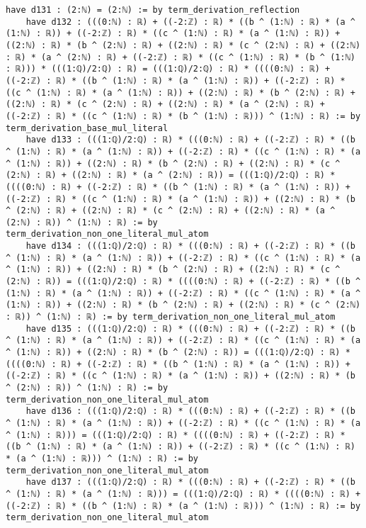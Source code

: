 \documentclass{article}
\begin{document}
\begin{tcolorbox}[colback=white!10, width=\linewidth]
\begin{lstlisting}[language=Lean4]
    have d131 : (2:ℕ) = (2:ℕ) := by term_derivation_reflection
    have d132 : (((0:ℕ) : ℝ) + ((-2:ℤ) : ℝ) * ((b ^ (1:ℕ) : ℝ) * (a ^ (1:ℕ) : ℝ)) + ((-2:ℤ) : ℝ) * ((c ^ (1:ℕ) : ℝ) * (a ^ (1:ℕ) : ℝ)) + ((2:ℕ) : ℝ) * (b ^ (2:ℕ) : ℝ) + ((2:ℕ) : ℝ) * (c ^ (2:ℕ) : ℝ) + ((2:ℕ) : ℝ) * (a ^ (2:ℕ) : ℝ) + ((-2:ℤ) : ℝ) * ((c ^ (1:ℕ) : ℝ) * (b ^ (1:ℕ) : ℝ))) * (((1:ℚ)/2:ℚ) : ℝ) = (((1:ℚ)/2:ℚ) : ℝ) * ((((0:ℕ) : ℝ) + ((-2:ℤ) : ℝ) * ((b ^ (1:ℕ) : ℝ) * (a ^ (1:ℕ) : ℝ)) + ((-2:ℤ) : ℝ) * ((c ^ (1:ℕ) : ℝ) * (a ^ (1:ℕ) : ℝ)) + ((2:ℕ) : ℝ) * (b ^ (2:ℕ) : ℝ) + ((2:ℕ) : ℝ) * (c ^ (2:ℕ) : ℝ) + ((2:ℕ) : ℝ) * (a ^ (2:ℕ) : ℝ) + ((-2:ℤ) : ℝ) * ((c ^ (1:ℕ) : ℝ) * (b ^ (1:ℕ) : ℝ))) ^ (1:ℕ) : ℝ) := by term_derivation_base_mul_literal
    have d133 : (((1:ℚ)/2:ℚ) : ℝ) * (((0:ℕ) : ℝ) + ((-2:ℤ) : ℝ) * ((b ^ (1:ℕ) : ℝ) * (a ^ (1:ℕ) : ℝ)) + ((-2:ℤ) : ℝ) * ((c ^ (1:ℕ) : ℝ) * (a ^ (1:ℕ) : ℝ)) + ((2:ℕ) : ℝ) * (b ^ (2:ℕ) : ℝ) + ((2:ℕ) : ℝ) * (c ^ (2:ℕ) : ℝ) + ((2:ℕ) : ℝ) * (a ^ (2:ℕ) : ℝ)) = (((1:ℚ)/2:ℚ) : ℝ) * ((((0:ℕ) : ℝ) + ((-2:ℤ) : ℝ) * ((b ^ (1:ℕ) : ℝ) * (a ^ (1:ℕ) : ℝ)) + ((-2:ℤ) : ℝ) * ((c ^ (1:ℕ) : ℝ) * (a ^ (1:ℕ) : ℝ)) + ((2:ℕ) : ℝ) * (b ^ (2:ℕ) : ℝ) + ((2:ℕ) : ℝ) * (c ^ (2:ℕ) : ℝ) + ((2:ℕ) : ℝ) * (a ^ (2:ℕ) : ℝ)) ^ (1:ℕ) : ℝ) := by term_derivation_non_one_literal_mul_atom
    have d134 : (((1:ℚ)/2:ℚ) : ℝ) * (((0:ℕ) : ℝ) + ((-2:ℤ) : ℝ) * ((b ^ (1:ℕ) : ℝ) * (a ^ (1:ℕ) : ℝ)) + ((-2:ℤ) : ℝ) * ((c ^ (1:ℕ) : ℝ) * (a ^ (1:ℕ) : ℝ)) + ((2:ℕ) : ℝ) * (b ^ (2:ℕ) : ℝ) + ((2:ℕ) : ℝ) * (c ^ (2:ℕ) : ℝ)) = (((1:ℚ)/2:ℚ) : ℝ) * ((((0:ℕ) : ℝ) + ((-2:ℤ) : ℝ) * ((b ^ (1:ℕ) : ℝ) * (a ^ (1:ℕ) : ℝ)) + ((-2:ℤ) : ℝ) * ((c ^ (1:ℕ) : ℝ) * (a ^ (1:ℕ) : ℝ)) + ((2:ℕ) : ℝ) * (b ^ (2:ℕ) : ℝ) + ((2:ℕ) : ℝ) * (c ^ (2:ℕ) : ℝ)) ^ (1:ℕ) : ℝ) := by term_derivation_non_one_literal_mul_atom
    have d135 : (((1:ℚ)/2:ℚ) : ℝ) * (((0:ℕ) : ℝ) + ((-2:ℤ) : ℝ) * ((b ^ (1:ℕ) : ℝ) * (a ^ (1:ℕ) : ℝ)) + ((-2:ℤ) : ℝ) * ((c ^ (1:ℕ) : ℝ) * (a ^ (1:ℕ) : ℝ)) + ((2:ℕ) : ℝ) * (b ^ (2:ℕ) : ℝ)) = (((1:ℚ)/2:ℚ) : ℝ) * ((((0:ℕ) : ℝ) + ((-2:ℤ) : ℝ) * ((b ^ (1:ℕ) : ℝ) * (a ^ (1:ℕ) : ℝ)) + ((-2:ℤ) : ℝ) * ((c ^ (1:ℕ) : ℝ) * (a ^ (1:ℕ) : ℝ)) + ((2:ℕ) : ℝ) * (b ^ (2:ℕ) : ℝ)) ^ (1:ℕ) : ℝ) := by term_derivation_non_one_literal_mul_atom
    have d136 : (((1:ℚ)/2:ℚ) : ℝ) * (((0:ℕ) : ℝ) + ((-2:ℤ) : ℝ) * ((b ^ (1:ℕ) : ℝ) * (a ^ (1:ℕ) : ℝ)) + ((-2:ℤ) : ℝ) * ((c ^ (1:ℕ) : ℝ) * (a ^ (1:ℕ) : ℝ))) = (((1:ℚ)/2:ℚ) : ℝ) * ((((0:ℕ) : ℝ) + ((-2:ℤ) : ℝ) * ((b ^ (1:ℕ) : ℝ) * (a ^ (1:ℕ) : ℝ)) + ((-2:ℤ) : ℝ) * ((c ^ (1:ℕ) : ℝ) * (a ^ (1:ℕ) : ℝ))) ^ (1:ℕ) : ℝ) := by term_derivation_non_one_literal_mul_atom
    have d137 : (((1:ℚ)/2:ℚ) : ℝ) * (((0:ℕ) : ℝ) + ((-2:ℤ) : ℝ) * ((b ^ (1:ℕ) : ℝ) * (a ^ (1:ℕ) : ℝ))) = (((1:ℚ)/2:ℚ) : ℝ) * ((((0:ℕ) : ℝ) + ((-2:ℤ) : ℝ) * ((b ^ (1:ℕ) : ℝ) * (a ^ (1:ℕ) : ℝ))) ^ (1:ℕ) : ℝ) := by term_derivation_non_one_literal_mul_atom

\end{lstlisting}
\end{tcolorbox}
\end{document}
